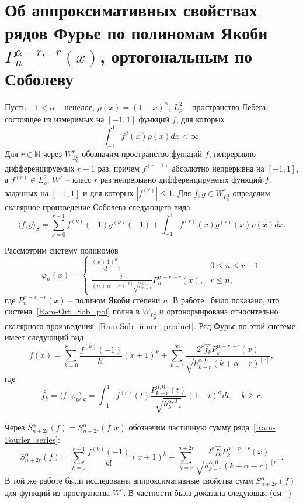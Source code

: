 \section{Об аппроксимативных свойствах рядов Фурье по полиномам Якоби \texorpdfstring{\linebreak$P_n^{\alpha-r,-r}(x)$}{}, ортогональным по Соболеву}\label{Ram-Jac}
Пусть $-1<\alpha$ -- нецелое, $\rho(x)=(1-x)^\alpha$, $L_\rho^2$ -- пространство Лебега, состоящее из измеримых на $[-1,1]$ функций $f$, для которых
$$
\int_{-1}^{1}f^2(x)\rho(x)dx<\infty.
$$
Для $r\in\mathbb{N}$ через $W^r_{L_\rho^2}$ обозначим пространство функций $f$, непрерывно дифференцируемых $r-1$ раз, причем $f^{(r-1)}$ абсолютно непрерывна на $[-1,1]$, а $f^{(r)}\in L_\rho^2$, $W^r$ -- класс $r$ раз непрерывно дифференцируемых функций $f$, заданных на $[-1,1]$ и для которых $|f^{(r)}|\le 1$.
Для $f,g\in W^r_{L_\rho^2}$ определим скалярное произведение Соболева следующего вида
\begin{equation}\label{Ram-Sob_inner_product}
\langle f,g\rangle_S=\sum_{\nu=0}^{r-1}f^{(\nu)}(-1)g^{(\nu)}(-1)+\int_{-1}^{1}f^{(r)}(x)g^{(r)}(x)\rho(x)dx.
\end{equation}

Рассмотрим систему полиномов
\begin{equation}\label{Ram-Ort_Sob_pol}
	\varphi_n(x)=
	\begin{cases}
		\frac{(x+1)^n}{n!}, & 0\le n\le r-1 \\
		\frac{2^r}{(n+\alpha-r)^{[r]}\sqrt{h_{n-r}^{\alpha,0}}}P_n^{\alpha-r,-r}(x), & r\le n,
	\end{cases}
\end{equation}
где $P_n^{\alpha-r,-r}(x)$ -- полином Якоби степени $n$. В работе~\cite{Ram-SharMN} было показано, что система~\eqref{Ram-Ort_Sob_pol} полна в $W^r_{L_\rho^2}$ и ортонормирована относительно скалярного произведения~\eqref{Ram-Sob_inner_product}. Ряд Фурье по этой системе имеет следующий вид
\begin{equation}\label{Ram-Fourier_series} f(x)=\sum_{k=0}^{r-1}\frac{f^{(k)}(-1)}{k!}(x+1)^k+\sum_{k=r}^{\infty}\frac{2^r\widehat{f_k}P_k^{\alpha-r,-r}(x)}{\sqrt{h_{k-r}^{\alpha,0}}(k+\alpha-r)^{[r]}},
\end{equation}
где
$$
\widehat{f_k}=\langle f,\varphi_k\rangle_S=\int_{-1}^{1}f^{(r)}(t)\frac{P_{k-r}^{\alpha,0}(t)}{\sqrt{h_{k-r}^{\alpha,0}}}(1-t)^\alpha dt, \quad k\ge r.
$$

Через $S^\alpha_{n+2r}(f)=S^\alpha_{n+2r}(f,x)$ обозначим частичную сумму ряда~\eqref{Ram-Fourier_series}:
$$
S^\alpha_{n+2r}(f)=\sum_{k=0}^{r-1}\frac{f^{(k)}(-1)}{k!}(x+1)^k+
\sum_{k=r}^{n+2r}\frac{2^r\widehat{f_k}P_k^{\alpha-r,-r}(x)}{\sqrt{h_{k-r}^{\alpha,0}}(k+\alpha-r)^{[r]}}.
$$
В той же работе были исследованы аппроксимативные свойства сумм $S^\alpha_{n+2r}(f)$ для функций из пространства $W^r$. В частности была доказана следующая (см.~\cite[теорема 4]{Ram-SharMN})

